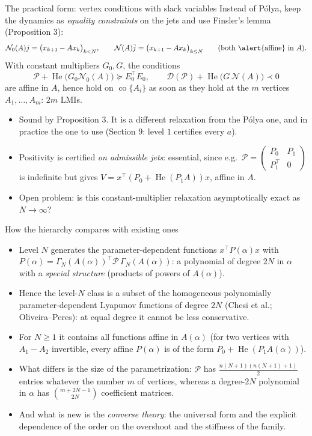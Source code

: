\documentclass[10pt,aspectratio=169]{beamer}
\newcommand{\tr}{^{\top}}
\newcommand{\PP}{\mathcal{P}}
\newcommand{\DD}{\mathcal{D}}
\newcommand{\NN}{\mathcal{N}}
\DeclareMathOperator{\He}{He}
\DeclareMathOperator{\co}{co}
\begin{document}
\begin{frame}{The practical form: vertex conditions with slack variables}
Instead of P\'olya, keep the dynamics as \emph{equality constraints} on the jets and use Finsler's lemma (Proposition 3):
\[
\NN_0(A)j=\big(x_{k+1}-Ax_k\big)_{k<N},\qquad \NN(A)\bar j=\big(x_{k+1}-Ax_k\big)_{k\le N}\qquad\text{(both \alert{affine} in }A).
\]
With constant multipliers $G_0,G$, the conditions
\[
\PP+\He\big(G_0\NN_0(A)\big)\succeq E_0\tr E_0,\qquad \DD(\PP)+\He\big(G\,\NN(A)\big)\prec0
\]
are affine in $A$, hence hold on $\co\{A_i\}$ as soon as they hold at the $m$ vertices $A_1,\dots,A_m$: \alert{$2m$ LMIs}.
\begin{itemize}
\item Sound by Proposition 3. It is a different relaxation from the P\'olya one, and in practice the one to use (Section 9: level $1$ certifies every $a$).
\item Positivity is certified \emph{on admissible jets}: essential, since e.g.\ $\PP=\begin{pmatrix}P_0&P_1\\P_1\tr&0\end{pmatrix}$ is indefinite but gives $V=x\tr(P_0+\He(P_1A))x$, affine in $A$.
\item Open problem: is this constant-multiplier relaxation asymptotically exact as $N\to\infty$?
\end{itemize}
\end{frame}

\begin{frame}{How the hierarchy compares with existing ones}
\begin{itemize}
\item Level $N$ generates the parameter-dependent functions $x\tr P(\alpha)x$ with $P(\alpha)=\Gamma_N(A(\alpha))\tr\PP\,\Gamma_N(A(\alpha))$: a polynomial of degree $2N$ in $\alpha$ with a \emph{special structure} (products of powers of $A(\alpha)$).
\item Hence the level-$N$ class is a \alert{subset} of the homogeneous polynomially parameter-dependent Lyapunov functions of degree $2N$ (Chesi et al.; Oliveira--Peres): at equal degree it cannot be less conservative.
\item For $N\ge1$ it contains all functions affine in $A(\alpha)$ (for two vertices with $A_1-A_2$ invertible, every affine $P(\alpha)$ is of the form $P_0+\He(P_1A(\alpha))$).
\item What differs is the \alert{size of the parametrization}: $\PP$ has $\frac{n(N+1)(n(N+1)+1)}{2}$ entries whatever the number $m$ of vertices, whereas a degree-$2N$ polynomial in $\alpha$ has $\binom{m+2N-1}{2N}$ coefficient matrices.
\item And what is new is the \emph{converse theory}: the universal form and the explicit dependence of the order on the overshoot and the stiffness of the family.
\end{itemize}
\end{frame}
\end{document}
